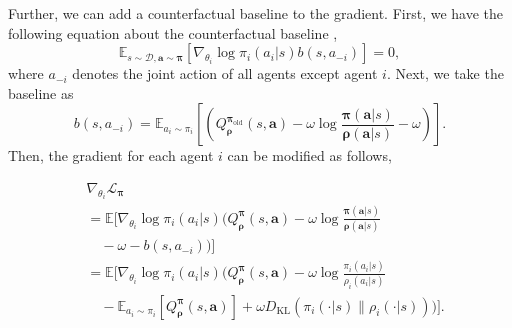 \documentclass{article}
\begin{document}
Further, we can add a counterfactual baseline to the gradient. First, we have the following equation about the counterfactual baseline \citep{COMA},
\begin{equation*}
	\mathbb{E}_{s \sim \mathcal{D}, \bm{a} \sim \bm{\pi}}\left[  \nabla_{\theta_i}\log{\pi}_i(a_i|s) b(s,a_{-i}) \right] = 0,
\end{equation*}
where $a_{-i}$ denotes the joint action of all agents except agent $i$. Next, we take the baseline as 
\begin{equation*}
	b(s,a_{-i}) = \mathbb{E}_{a_i \sim \pi_i} [(  Q^{{\bm{\pi}}_{\operatorname{old}}}_{\bm{\rho}}(s,\bm{a}) - \omega \log \frac{{\bm{\pi}}(\bm{a}|s)}{{\bm{\rho}}(\bm{a}|s)} - \omega)].
\end{equation*}
Then, the gradient for each agent $i$ can be modified as follows,
\iffalse
\begin{equation*}
	\begin{split}
		& \nabla_{\theta_i} \mathcal{L}_{\bm{\pi}} = \mathbb{E} [\nabla_{\theta_i} \log\pi_i(a_i|s) ( Q^{\bm{\pi}}_{\bm{\rho}}(s,\bm{a}) - \omega\log \frac{{\bm{\pi}}(\bm{a}|s)}{{\bm{\rho}}(\bm{a}|s)}  - \omega -b(s,a_{-i}) ) ] \\
		& = \mathbb{E}[  \nabla_{\theta_i} \log\pi_i(a_i|s) ( Q^{{\bm{\pi}}}_{\bm{\rho}}(s,\bm{a})  - \omega \log \frac{\pi_i(a_i|s)}{\rho_i(a_i|s)} 
		- \mathbb{E}_{a_i \sim \pi_i} [ Q^{{\bm{\pi}}}_{\bm{\rho}}(s,\bm{a})] + \omega D_{\operatorname{KL}}(\pi_i(\cdot|s) \| \rho_i(\cdot|s)) ) ]. \label{pg-final}
	\end{split}
\end{equation*}
\fi
\iffalse
\begin{equation*}
	\begin{split}
		& \nabla_{\theta_i} \mathcal{L}_{\bm{\pi}} \\
		& = \mathbb{E} \bigg[\nabla_{\theta_i} \log\pi_i(a_i|s) ( Q^{\bm{\pi}}_{\bm{\rho}}(s,\bm{a}) - \omega\log \frac{{\bm{\pi}}(\bm{a}|s)}{{\bm{\rho}}(\bm{a}|s)} \\
		& \quad - \omega -b(s,a_{-i}) ) \bigg] \\
		& = \mathbb{E} \bigg[  \nabla_{\theta_i} \log\pi_i(a_i|s) ( Q^{{\bm{\pi}}}_{\bm{\rho}}(s,\bm{a})  - \omega \log \frac{\pi_i(a_i|s)}{\rho_i(a_i|s)} \\
		& \quad - \mathbb{E}_{a_i \sim \pi_i} [ Q^{{\bm{\pi}}}_{\bm{\rho}}(s,\bm{a})] + \omega D_{\operatorname{KL}}(\pi_i(\cdot|s) \| \rho_i(\cdot|s)) ) \bigg]. \label{pg-final}
	\end{split}
\end{equation*}
\end{document}
